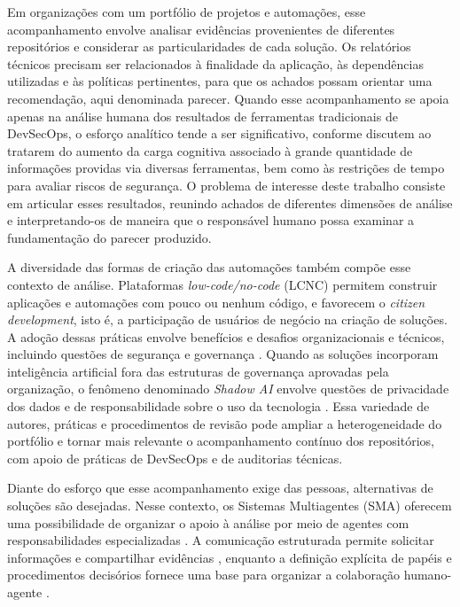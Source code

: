 Em organizações com um portfólio de projetos e automações, esse acompanhamento envolve analisar evidências provenientes de diferentes repositórios e considerar as particularidades de cada solução. Os relatórios técnicos precisam ser relacionados à finalidade da aplicação, às dependências utilizadas e às políticas pertinentes, para que os achados possam orientar uma recomendação, aqui denominada parecer. Quando esse acompanhamento se apoia apenas na análise humana dos resultados de ferramentas tradicionais de DevSecOps, o esforço analítico tende a ser significativo, conforme discutem  ao tratarem do aumento da carga cognitiva associado à grande quantidade de informações providas via diversas ferramentas, bem como às restrições de tempo para avaliar riscos de segurança. O problema de interesse deste trabalho consiste em articular esses resultados, reunindo achados de diferentes dimensões de análise e interpretando-os de maneira que o responsável humano possa examinar a fundamentação do parecer produzido.

A diversidade das formas de criação das automações também compõe esse contexto de análise. Plataformas \textit{low-code/no-code} (LCNC) permitem construir aplicações e automações com pouco ou nenhum código, e favorecem o \textit{citizen development}, isto é, a participação de usuários de negócio na criação de soluções. A adoção dessas práticas envolve benefícios e desafios organizacionais e técnicos, incluindo questões de segurança e governança \cite{ajimati2025}. Quando as soluções incorporam inteligência artificial fora das estruturas de governança aprovadas pela organização, o fenômeno denominado \textit{Shadow AI} envolve questões de privacidade dos dados e de responsabilidade sobre o uso da tecnologia \cite{silic2025}. Essa variedade de autores, práticas e procedimentos de revisão pode ampliar a heterogeneidade do portfólio e tornar mais relevante o acompanhamento contínuo dos repositórios, com apoio de práticas de DevSecOps e de auditorias técnicas.

Diante do esforço que esse acompanhamento exige das pessoas, alternativas de soluções são desejadas. Nesse contexto, os Sistemas Multiagentes (SMA) oferecem uma possibilidade de organizar o apoio à análise por meio de agentes com responsabilidades especializadas \cite{wooldridge2009}. A comunicação estruturada permite solicitar informações e compartilhar evidências \cite{lazarin2025}, enquanto a definição explícita de papéis e procedimentos decisórios fornece uma base para organizar a colaboração humano-agente \cite{ait2025}.


